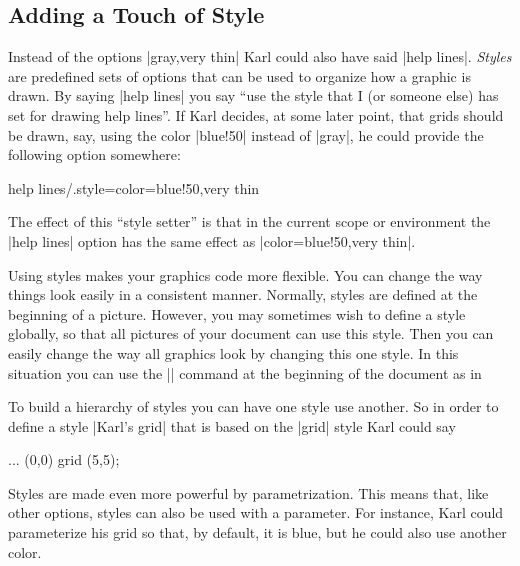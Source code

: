 \subsection{Adding a Touch of  Style}

Instead of the options |gray,very thin| Karl could also have said |help lines|.
\emph{Styles} are predefined sets of options that can be used to organize how a
graphic is drawn. By saying |help lines| you say ``use the style that I (or
someone else) has set for drawing help lines''. If Karl decides, at some later
point, that grids should be drawn, say, using the color |blue!50| instead of
|gray|, he could provide the following option somewhere:
%
\begin{codeexample}
help lines/.style={color=blue!50,very thin}
\end{codeexample}
%
The effect of this ``style setter'' is that in the current scope or environment
the |help lines| option has the same effect as |color=blue!50,very thin|.

Using styles makes your graphics code more flexible. You can change the way
things look easily in a consistent manner. Normally, styles are defined at the
beginning of a picture. However, you may sometimes wish to define a style
globally, so that all pictures of your document can use this style. Then you
can easily change the way all graphics look by changing this one style. In this
situation you can use the |\tikzset| command at the beginning of the document
as in
%
\begin{codeexample}
\tikzset{help lines/.style=very thin}
\end{codeexample}

To build a hierarchy of styles you can have one style use another. So in order
to define a style |Karl's grid| that is based on the |grid| style Karl could
say
%
\begin{codeexample}
...
 (0,0) grid (5,5);
\end{codeexample}

Styles are made even more powerful by parametrization. This means that, like
other options, styles can also be used with a parameter. For instance, Karl
could parameterize his grid so that, by default, it is blue, but he could also
use another color.
%
\begin{codeexample}
\end{codeexample}

